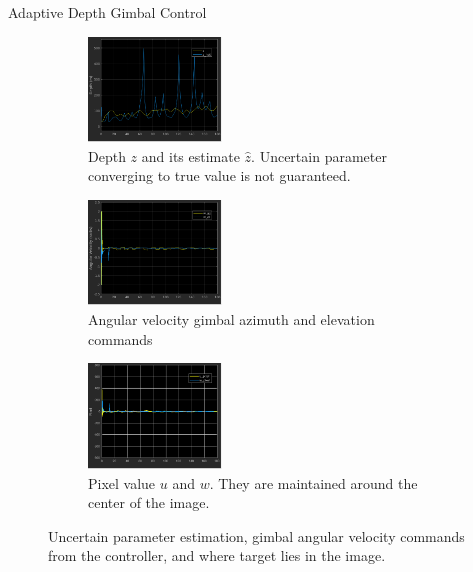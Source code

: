 \documentclass[9pt]{beamer}
\newenvironment{figure*}%
{\begin{figure}}
{\end{figure}}
\begin{document}
\begin{frame}{Adaptive Depth Gimbal Control}
\begin{figure}[htbp]
	\centering
	\begin{subfigure}{0.32\textwidth}
		\centering
		\includegraphics[width=1.4in]{chapter2/uav_z}
		\caption{Depth $z$ and its estimate $\hat{z}$. Uncertain parameter converging to true value is not guaranteed.}
	\end{subfigure}%
	\begin{subfigure}{0.32\textwidth}
		\centering
		\includegraphics[width=1.4in]{chapter2/uav_gimbal_command}
		\caption{Angular velocity gimbal azimuth and elevation commands}
	\end{subfigure}
	\begin{subfigure}{0.32\textwidth}
		\centering
		\includegraphics[width=1.4in]{chapter2/uav_pixel}
		\caption{Pixel value $u$ and $w$. They are maintained around the center of the image.}
	\end{subfigure}	
	\caption{Uncertain parameter estimation, gimbal angular velocity commands from the controller, and where target lies in the image.}
	\label{uav_adaptive_additional}
\end{figure}	
\end{frame}
\end{document}
